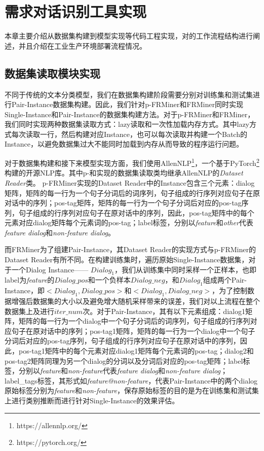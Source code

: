 \chapter{需求对话识别工具实现}

本章主要介绍从数据集构建到模型实现等代码工程实现，对{\tool}的工作流程结构进行阐述，并且介绍{\tool}在工业生产环境部署流程情况。


\section{数据集读取模块实现}

不同于传统的文本分类模型，我们在数据集构建阶段需要分别对训练集和测试集进行Pair-Instance数据集构建。因此，我们针对p-FRMiner和FRMiner同时实现Single-Instance和Pair-Instance的数据集构建方法。对于p-FRMiner和FRMiner，我们同时实现两种数据集读取方式：lazy读取和一次性加载内存方式。其中lazy方式每次读取一行，然后构建对应Instance，也可以每次读取并构建一个Batch的Instance，以避免数据集过大不能同时加载到内存从而导致的程序运行问题。

对于数据集构建和接下来模型实现方面，我们使用AllenNLP\footnote{https://allennlp.org/}，一个基于PyTorch\footnote{https://pytorch.org/}构建的开源NLP库。其中p-{\tool}和{\tool}实现的数据集读取类均继承AllenNLP的\textit{Dataset Reader}类。
p-FRMiner实现的Dataset Reader中的Instance包含三个元素：dialog矩阵，矩阵的每一行为一个句子分词后的词序列，句子组成的行序列对应句子在原对话中的序列；pos-tag矩阵，矩阵的每一行为一个句子分词后对应的pos-tag序列，句子组成的行序列对应句子在原对话中的序列，因此，pos-tag矩阵中的每个元素对应dialog矩阵每个元素词的pos-tag；label标签，分别以\textit{feature}和\textit{other}代表\textit{feature dialog}和\textit{non-feature dialog}。

而FRMiner为了组建Pair-Instance，其Dataset Reader的实现方式与p-FRMiner的Dataset Reader有所不同。在构建训练集时，遍历原始Single-Instance数据集，对于一个Dialog Instance—— $Dialog_1$，我们从训练集中同时采样一个正样本，也即label为\textit{feature}的$Dialog\_pos$和一个负样本$Dialog\_neg$，和$Dialog_1$组成两个Pair-Instance，即$<Dialog_1,Dialog\_pos>$和$<Dialog_1,Dialog\_neg>$，为了控制数据增强后数据集的大小以及避免增大随机采样带来的误差，我们对以上流程在整个数据集上及进行$iter\_num$次。对于Pair-Instance，其有以下元素组成：dialog1矩阵，矩阵的每一行为一个dialog中一个句子分词后的词序列，句子组成的行序列对应句子在原对话中的序列；pos-tag1矩阵，矩阵的每一行为一个dialog中一个句子分词后对应的pos-tag序列，句子组成的行序列对应句子在原对话中的序列，因此，pos-tag1矩阵中的每个元素对应dialog1矩阵每个元素词的pos-tag；dialog2和pos-tag2矩阵同理为另一个dialog的分词以及分词后对应的pos-tag矩阵；label标签，分别以\textit{feature}和\textit{non-feature}代表\textit{feature dialog}和\textit{non-feature dialog}；label\_tags标签，其形式如\textit{feature@non-feature}，代表Pair-Instance中的两个dialog原始标签分别为\textit{feature}和\textit{non-feature}，保存原始标签的目的是为在训练集和测试集上进行类别推断而进行针对Single-Instance的效果评估。

